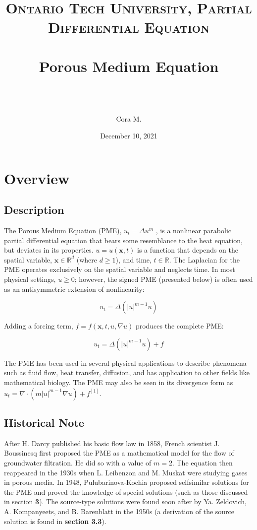 \documentclass[paper=a4, fontsize=12pt]{scrartcl} %
\title{	
\normalfont \normalsize 
\textsc{Ontario Tech University, Partial Differential Equation} \\ [25pt] %
\horrule{0.5pt} \\[0.4cm] %
\huge Porous Medium Equation\\ %
\horrule{2pt} \\[0.5cm] %
}
\author{\\ Cora M.}
\date{\normalsize December 10, 2021} %
\numberwithin{equation}{section} %
\numberwithin{table}{section} %
\begin{document}
\maketitle

\tableofcontents

\doublespacing
\section{Overview}
\subsection{Description}

The Porous Medium Equation (PME), $u_t = \Delta u^m$ , is a nonlinear parabolic partial differential equation that bears some resemblance to the heat equation, but deviates in its properties. $u=u(\mathbf{x}, t)$ is a function that depends on the spatial variable, $\mathbf{x} \in \mathbb{R}^d$ (where $d \geq 1$), and time, $t \in \mathbb{R}$.  The Laplacian for the PME operates exclusively on the spatial variable and neglects time. In most physical settings, $u \ge 0$; however, the signed PME (presented below) is often used as an antisymmetric extension of nonlinearity:

$$u_t = \Delta (|u|^{m-1}u)$$

Adding a forcing term, $f=f(\mathbf{x},t, u, \nabla u)$ produces the complete PME: 

$$ u_t  = \Delta (|u|^{m-1}u) + f$$

The PME has been used in several physical applications to describe phenomena such as fluid flow, heat transfer, diffusion, and has application to other fields like mathematical biology. The PME may also be seen in its divergence form as $u_t =  \nabla \cdot (m|u|^{m-1} \nabla u) + f ^{[1]}$.
\subsection{Historical Note}

After H. Darcy published his basic flow law in 1858, French scientist J. Boussinesq first proposed the PME as a mathematical model for the flow of groundwater filtration. He did so with a value of $m=2$. The equation then reappeared in the 1930s when L. Leibenzon and M. Muskat were studying gases in porous media. In 1948, Pulubarinova-Kochia proposed selfsimilar solutions for the PME and proved the knowledge of special solutions (such as those discussed in section \textbf{3}). The source-type solutions were found soon after by Ya. Zeldovich, A. Kompanyeets, and B. Barenblatt in the 1950s (a derivation of the source solution is found in \textbf{section 3.3}). 
\end{document}
